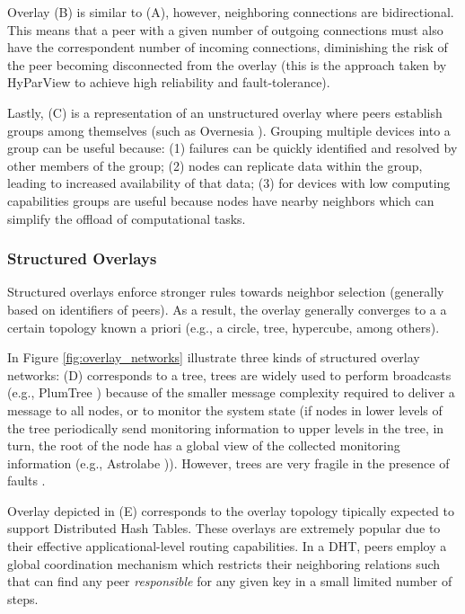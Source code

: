 Overlay (B) is similar to (A), however, neighboring connections are bidirectional. This means that a peer with a given number of outgoing connections must also have the correspondent number of incoming connections, diminishing the risk of the peer becoming disconnected from the overlay (this is the approach taken by HyParView \cite{Hyparview} to achieve high reliability and fault-tolerance).

Lastly, (C) is a representation of an unstructured overlay where peers establish groups among themselves (such as Overnesia \cite{leitao2014overnesia}). Grouping multiple devices into a group can be useful because: (1) failures can be quickly identified and resolved by other members of the group; (2) nodes can replicate data within the group, leading to increased availability of that data; (3) for devices with low computing capabilities groups are useful because nodes have nearby neighbors which can simplify the offload of computational tasks. 

\subsubsection*{Structured Overlays}

Structured overlays enforce stronger rules towards neighbor selection (generally based on identifiers of peers). As a result, the overlay generally converges to a a certain topology known a priori (e.g., a circle, tree, hypercube, among others). 

In Figure \ref{fig:overlay_networks} illustrate three kinds of structured overlay networks: (D) corresponds to a tree, trees are widely used to perform broadcasts (e.g., PlumTree \cite{leitao2007epidemic}) because of the smaller message complexity required to deliver a message to all nodes, or to monitor the system state (if nodes in lower levels of the tree periodically send monitoring information to upper levels in the tree, in turn, the root of the node has a global view of the collected monitoring information (e.g., Astrolabe \cite{Renesse2003})). However, trees are very fragile in the presence of faults \cite{leitao2007epidemic}.

Overlay depicted in (E) corresponds to the overlay topology tipically expected to support Distributed Hash Tables. These overlays are extremely popular due to their effective applicational-level routing capabilities. In a DHT, peers employ a global coordination mechanism which restricts their neighboring relations such that can find any peer \textit{responsible} for any given key in a small limited number of steps.

